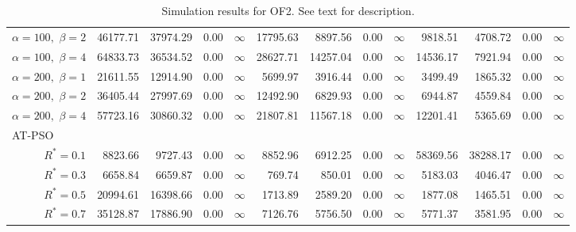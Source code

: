 \documentclass[cmbright]{staauth}
\begin{document}
\begin{table}[ht]
{\begin{tabular}{r|rrrr|rrrr|rrrr}
  $\alpha = 100,$ $\beta =2$ & 46177.71 & 37974.29 & 0.00 & $\infty$ & 17795.63 & 8897.56 & 0.00 & $\infty$ & 9818.51 & 4708.72 & 0.00 & $\infty$ \\
  $\alpha = 100,$ $\beta =4$ & 64833.73 & 36534.52 & 0.00 & $\infty$ & 28627.71 & 14257.04 & 0.00 & $\infty$ & 14536.17 & 7921.94 & 0.00 & $\infty$ \\
  $\alpha = 200,$ $\beta =1$ & 21611.55 & 12914.90 & 0.00 & $\infty$ & 5699.97 & 3916.44 & 0.00 & $\infty$ & 3499.49 & 1865.32 & 0.00 & $\infty$ \\
  $\alpha = 200,$ $\beta =2$ & 36405.44 & 27997.69 & 0.00 & $\infty$ & 12492.90 & 6829.93 & 0.00 & $\infty$ & 6944.87 & 4559.84 & 0.00 & $\infty$ \\
  $\alpha = 200,$ $\beta =4$ & 57723.16 & 30860.32 & 0.00 & $\infty$ & 21807.81 & 11567.18 & 0.00 & $\infty$ & 12201.41 & 5365.69 & 0.00 & $\infty$ \\
\hline
\multicolumn{1}{l|}{AT-PSO} &&&&&&&&&&&&\\
  $R^* = 0.1$ & 8823.66 & 9727.43 & 0.00 & $\infty$ & 8852.96 & 6912.25 & 0.00 & $\infty$ & 58369.56 & 38288.17 & 0.00 & $\infty$ \\
  $R^* = 0.3$ & 6658.84 & 6659.87 & 0.00 & $\infty$ & 769.74 & 850.01 & 0.00 & $\infty$ & 5183.03 & 4046.47 & 0.00 & $\infty$ \\
  $R^* = 0.5$ & 20994.61 & 16398.66 & 0.00 & $\infty$ & 1713.89 & 2589.20 & 0.00 & $\infty$ & 1877.08 & 1465.51 & 0.00 & $\infty$ \\
  $R^* = 0.7$ & 35128.87 & 17886.90 & 0.00 & $\infty$ & 7126.76 & 5756.50 & 0.00 & $\infty$ & 5771.37 & 3581.95 & 0.00 & $\infty$ \\
   \hline
\end{tabular}
}
\caption{Simulation results for OF2. See text for description.}
\label{tab:psosim2}
\end{table}
\end{document}
